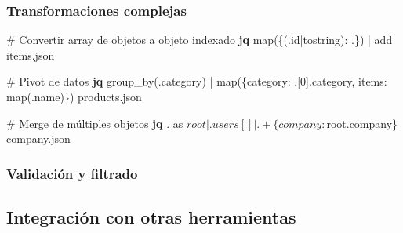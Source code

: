 \documentclass[
  11pt,
  letterpaper,
  oneside,
  openany]{scrbook}
\newenvironment{Shaded}{}{}
\newcommand{\CommentTok}[1]{\textcolor[rgb]{0.42,0.45,0.49}{#1}}
\newcommand{\ExtensionTok}[1]{\textcolor[rgb]{0.84,0.23,0.29}{\textbf{#1}}}
\newcommand{\NormalTok}[1]{\textcolor[rgb]{0.14,0.16,0.18}{#1}}
\newcommand{\StringTok}[1]{\textcolor[rgb]{0.01,0.18,0.38}{#1}}
\begin{document}
\subsubsection{Transformaciones
complejas}\label{transformaciones-complejas}

\begin{Shaded}
\begin{Highlighting}[]
\CommentTok{\# Convertir array de objetos a objeto indexado}
\ExtensionTok{jq} \StringTok{\textquotesingle{}map(\{(.id|tostring): .\}) | add\textquotesingle{}}\NormalTok{ items.json}

\CommentTok{\# Pivot de datos}
\ExtensionTok{jq} \StringTok{\textquotesingle{}group\_by(.category) | map(\{category: .[0].category, items: map(.name)\})\textquotesingle{}}\NormalTok{ products.json}

\CommentTok{\# Merge de múltiples objetos}
\ExtensionTok{jq} \StringTok{\textquotesingle{}. as $root | .users[] | . + \{company: $root.company\}\textquotesingle{}}\NormalTok{ company.json}
\end{Highlighting}
\end{Shaded}

\subsubsection{Validación y filtrado}\label{validaciuxf3n-y-filtrado}

\begin{Shaded}
\end{Shaded}

\subsection{Integración con otras
herramientas}\label{integraciuxf3n-con-otras-herramientas}
\end{document}

